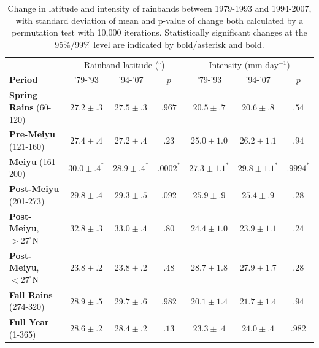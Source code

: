 \documentclass[final,grl]{agutexSI}
\begin{document}
\begin{table}

\centering

\caption{Change in latitude and intensity of rainbands between 1979-1993 and 1994-2007, with standard deviation of mean and p-value of change both calculated by a permutation test with 10,000 iterations. Statistically significant changes at the 95\%/99\% level are indicated by bold/asterisk and bold.}

\begin{tabular}{ l c c c c c c}
	& \multicolumn{3}{c}{Rainband latitude ($^\circ$)} & \multicolumn{3}{c}{Intensity (mm day$^{-1})$} \\
	\textbf{Period} & '79-'93 & '94-'07 & $p$ & '79-'93 & '94-'07 & $p$ \\
	\hline	
	\textbf{Spring Rains} (60-120)		& $27.2 \pm .3 $ & $27.5 \pm .3 $ & $ .967 $ 	& $20.5 \pm .7$ 	& $20.6 \pm .8 	$ & $.54$ \\
	\textbf{Pre-Meiyu} (121-160) 		& $27.4 \pm .4 $ & $27.2 \pm .4$ & $ .23 $ 	& $25.0 \pm 1.0$ 	& $26.2 \pm 1.1	$ & $.94$ \\
	\textbf{Meiyu} (161-200)			& $\boldsymbol{30.0 \pm .4^*}$ & $\boldsymbol{28.9 \pm .4^*}$ & $\boldsymbol{.0002^*}$ & $\boldsymbol{27.3 \pm 1.1^*}$ 	& $\boldsymbol{29.8 \pm 1.1^*}$  & $\boldsymbol{.9994 ^*}$ \\
	\textbf{Post-Meiyu} (201-273)		& $29.8 \pm .4 $ & $29.3 \pm .5 $ & $ .092 $	& $25.9 \pm .9$ 	& $25.4 \pm .9	$ & $.28$ \\
	\textbf{Post-Meiyu}, $>27^\circ$N 	& $32.8 \pm .3 $ & $33.0 \pm .4 $ & $ .80 $ 	& $24.4 \pm 1.0$ 	& $23.9 \pm 1.1	$ & $.24$ \\
	\textbf{Post-Meiyu}, $<27^\circ$N 	& $23.8 \pm .2 $ & $23.8 \pm .2 $ & $ .48 $ 	& $28.7 \pm 1.8$ 	& $27.9 \pm 1.7	$ & $.28$  \\
	\textbf{Fall Rains} (274-320)			& $\boldsymbol{28.9 \pm .5} $ & $\boldsymbol{29.7 \pm .6} $ & $ \boldsymbol{.982} $ 	& $20.1 \pm 1.4$ 	& $21.7 \pm 1.4	$ & $.94$ \\
	\textbf{Full Year} (1-365)			& $28.6 \pm .2 $ & $28.4 \pm .2 $ & $ .13 $ 	& $\boldsymbol{23.3 \pm .4}$ 	& $\boldsymbol{24.0 \pm .4}	$ & $\boldsymbol{.982}$ \\

\end{tabular}
\label{ts8}
\end{table}
\end{document}
